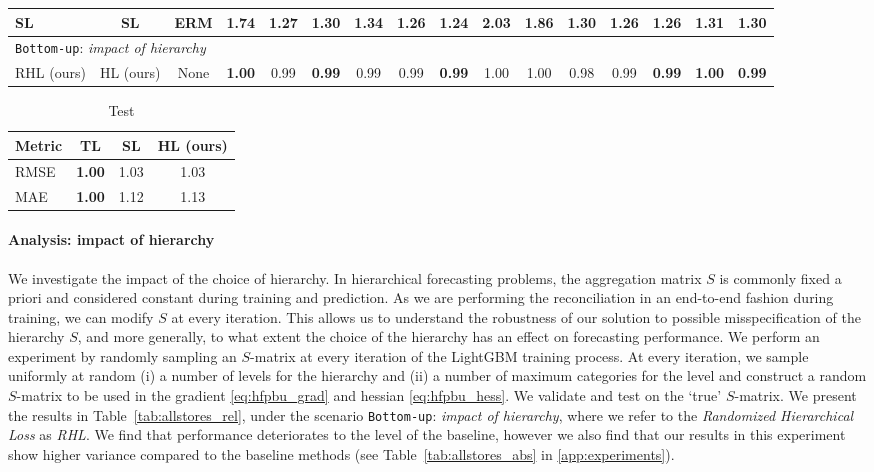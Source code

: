 \documentclass[preprint, 3p, times, twocolumn]{elsarticle}
\begin{document}
\begin{table}
\begin{center}
{\begin{tabular}{l c  cccccccccccccc}
    \hspace{0.1cm} 	SL	&SL	&ERM	&1.74	&1.27	&1.30	&1.34	&1.26	&1.24	&2.03	&1.86	&1.30	&1.26	&1.26	&1.31	&1.30	\\    
    \midrule
    \midrule
    \multicolumn{4}{l}{\texttt{Bottom-up}: \textit{impact of hierarchy}}																	\\
    \hspace{0.1cm} 	RHL (ours)	&HL (ours)	&None	&\textbf{1.00}	&0.99	&\textbf{0.99}	&0.99	&0.99	&\textbf{0.99}	&1.00	&1.00	&0.98	&0.99	&\textbf{0.99}	&\textbf{1.00}	&\textbf{0.99}	\\
    \bottomrule
    \end{tabular}}
    \end{center}
    \end{table}


    \begin{table}[t]
      \caption{Test}
      \label{tab:presentation_table}
      \begin{center}
      {\small\setlength{\tabcolsep}{2pt} 
      \begin{tabular}{l c  cc}
      \toprule 
      Metric &TL &SL &HL (ours) \\
      \midrule
      RMSE &\textbf{1.00} &1.03 &1.03 \\ 
      MAE &\textbf{1.00} &1.12 &1.13 \\
      \bottomrule
      \end{tabular}}
      \end{center}
      \end{table}

  \paragraph{Analysis: impact of hierarchy} We investigate the impact of the choice of hierarchy. In hierarchical forecasting problems, the aggregation matrix \(S\) is commonly fixed a priori and considered constant during training and prediction. As we are performing the reconciliation in an end-to-end fashion during training, we can modify \(S\) at every iteration. This allows us to understand the robustness of our solution to possible misspecification of the hierarchy \(S\), and more generally, to what extent the choice of the hierarchy has an effect on forecasting performance. We perform an experiment by randomly sampling an \(S\)-matrix at every iteration of the LightGBM training process. At every iteration, we sample uniformly at random (i) a number of levels for the hierarchy and (ii) a number of maximum categories for the level and construct a random \(S\)-matrix to be used in the gradient \eqref{eq:hfpbu_grad} and hessian \eqref{eq:hfpbu_hess}. We validate and test on the `true' \(S\)-matrix. We present the results in Table~\ref{tab:allstores_rel}, under the scenario \texttt{Bottom-up}: \textit{impact of hierarchy}, where we refer to the \textit{Randomized Hierarchical Loss} as \textit{RHL}. We find that performance deteriorates to the level of the baseline, however we also find that our results in this experiment show higher variance compared to the baseline methods (see Table~\ref{tab:allstores_abs} in \ref{app:experiments}). 
\end{document}
